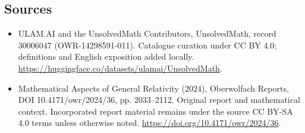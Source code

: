 \documentclass[11pt]{article}
\begin{document}
\subsection{Sources}
\begin{itemize}
\item[\hypertarget{source:30006047:1}{S1}] ULAM.AI and the UnsolvedMath Contributors, UnsolvedMath, record 30006047 (OWR-14298591-011). Catalogue curation under CC BY 4.0; definitions and English exposition added locally.
\url{https://huggingface.co/datasets/ulamai/UnsolvedMath}.
\item[\hypertarget{source:30006047:2}{S2}] Mathematical Aspects of General Relativity (2024), Oberwolfach Reports, DOI 10.4171/owr/2024/36, pp. 2033--2112. Original report and mathematical context. Incorporated report material remains under the source CC BY-SA 4.0 terms unless otherwise noted.
\url{https://doi.org/10.4171/owr/2024/36}.
\end{itemize}
\label{end:30006047}
\end{document}
